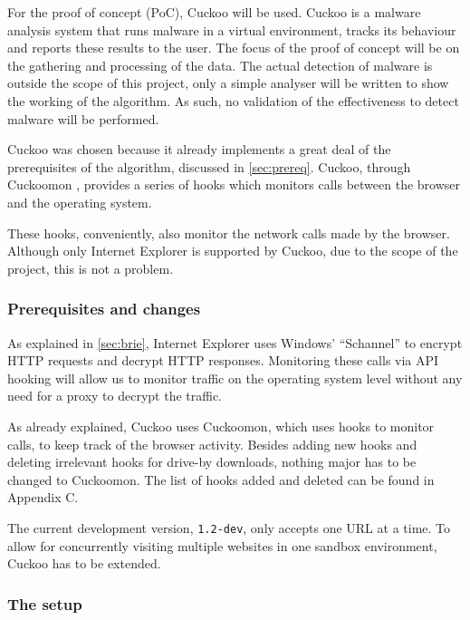 
For the proof of concept (PoC), Cuckoo \cite{cuckoo} will be used. Cuckoo is a malware analysis system that runs malware in a virtual environment, tracks its behaviour and reports these results to the user. The focus of the proof of concept will be on the gathering and processing of the data. The actual detection of malware is outside the scope of this project, only a simple analyser will be written to show the working of the algorithm. As such, no validation of the effectiveness to detect malware will be performed. 

Cuckoo was chosen because it already implements a great deal of the prerequisites of the algorithm, discussed in \ref{sec:prereq}. Cuckoo, through Cuckoomon \cite{cuckoomon}, provides a series of hooks which monitors calls between the browser and the operating system.

These hooks, conveniently, also monitor the network calls made by the browser. Although only Internet Explorer is supported by Cuckoo, due to the scope of the project, this is not a problem.

\subsubsection{Prerequisites and changes}

As explained in \ref{sec:brie}, Internet Explorer uses Windows' ``Schannel'' \cite{schannel} to encrypt HTTP requests and decrypt HTTP responses. Monitoring these calls via API hooking will allow us to monitor traffic on the operating system level without any need for a proxy to decrypt the traffic.

As already explained, Cuckoo uses Cuckoomon, which uses hooks to monitor calls, to keep track of the browser activity. Besides adding new hooks and deleting irrelevant hooks for drive-by downloads, nothing major has to be changed to Cuckoomon. The list of hooks added and deleted can be found in Appendix C.

The current development version, \texttt{1.2-dev},  only accepts one URL at a time. To allow for concurrently visiting multiple websites in one sandbox environment, Cuckoo has to be extended.

\subsubsection{The setup}
\label{sec:setup}

